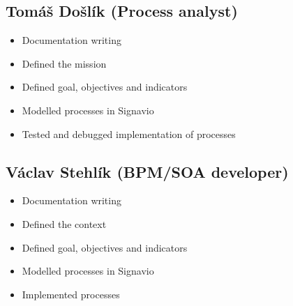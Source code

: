 \documentclass[11pt,a4paper]{article}
\begin{document}
\subsection{Tomáš Došlík (Process analyst)}

\begin{itemize}
    \item Documentation writing
    \item Defined the mission
    \item Defined goal, objectives and indicators
    \item Modelled processes in Signavio
    \item Tested and debugged implementation of processes
\end{itemize}

\subsection{Václav Stehlík (BPM/SOA developer)}

\begin{itemize}
    \item Documentation writing
    \item Defined the context
    \item Defined goal, objectives and indicators
    \item Modelled processes in Signavio
    \item Implemented processes
\end{itemize}
\end{document}

